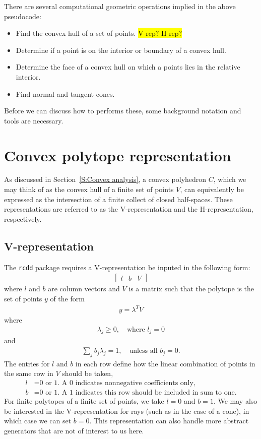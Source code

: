 There are several computational geometric operations implied in the above pseudocode:
\begin{itemize}
\item Find the convex hull of a set of points.  \hl{V-rep?  H-rep?}
\item Determine if a point is on the interior or boundary of a convex hull.
\item Determine the face of a convex hull on which a points lies in the relative interior.
\item Find normal and tangent cones.
\end{itemize}

Before we can discuss how to performs these, some background notation
and tools are necessary.

\section{Convex polytope representation}
As discussed in Section~\ref{S:Convex analysis}, a convex polyhedron $C$, which we 
may think of as the convex hull of a finite set of points $V$, can equivalently
be expressed as the intersection of a finite collect of closed half-spaces.  These
representations are referred to as the V-representation and the H-representation, 
respectively.

\subsection{V-representation} \label{S:V-rep}
The \texttt{rcdd} package requires a V-representation be inputed in the following form:
\begin{align} \label{E:V-rep}
	\left[\begin{array}{ccc}l & b & V\end{array}\right]
\end{align}
where $l$ and $b$ are column vectors and $V$ is a matrix such that the polytope
is the set of points $y$ of the form
\begin{align*}
	y = \lambda^T V
\end{align*}
where
\begin{align*}
	\lambda_j \geq 0, \quad \text{where $l_j = 0$}
\end{align*}
and 
\begin{align*}
	\sum_j b_j \lambda_j = 1, \quad \text{unless all $b_j = 0$.}
\end{align*}
The entries for $l$ and $b$ in each row define how the linear combination of 
points in the same row in $V$ should be taken,
\begin{align*}
	l &= \text{0 or 1.  A 0 indicates nonnegative coefficients only,}\\
	b &= \text{0 or 1.  A 1 indicates this row should be included in sum to one.}
\end{align*}
For finite polytopes of a finite set of points, we take $l = 0$ and $b = 1$.  
We may also be interested in the V-representation for rays (such as in the
case of a cone), in which case we can set $b=0$.  
This representation can also handle more abstract generators that 
are not of interest to us here.

